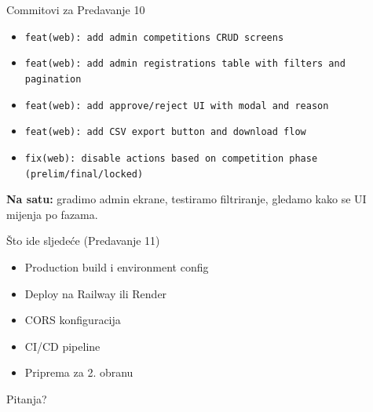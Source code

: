 \begin{frame}{Commitovi za Predavanje 10}
\begin{itemize}
  \item \texttt{feat(web): add admin competitions CRUD screens}
  \item \texttt{feat(web): add admin registrations table with filters and pagination}
  \item \texttt{feat(web): add approve/reject UI with modal and reason}
  \item \texttt{feat(web): add CSV export button and download flow}
  \item \texttt{fix(web): disable actions based on competition phase (prelim/final/locked)}
\end{itemize}

\vspace{0.4em}
\textbf{Na satu:} gradimo admin ekrane, testiramo filtriranje, gledamo kako se UI mijenja po fazama.
\end{frame}

\begin{frame}{Što ide sljedeće (Predavanje 11)}
\begin{itemize}
  \item Production build i environment config
  \item Deploy na Railway ili Render
  \item CORS konfiguracija
  \item CI/CD pipeline
  \item Priprema za 2. obranu
\end{itemize}

\vspace{0.8em}
\begin{center}
\Large Pitanja?
\end{center}
\end{frame}


